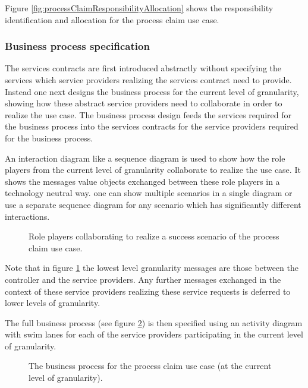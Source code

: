 \documentclass{IOS-Book-Article}
\begin{document}
Figure \ref{fig:processClaimResponsibilityAllocation} shows the responsibility identification and allocation for the
process claim use case.


\subsubsection{Business process specification}

The services contracts are first introduced abstractly without specifying the services which service providers
realizing the services contract need to provide. Instead one next designs the business process for the current
level of granularity, showing how these abstract service providers need to collaborate in order to realize the use case.
The business process design feeds the services required for the business process into the services contracts for
the service providers required for the business process.

An interaction diagram like a sequence diagram is used to show how the role players from the current level of granularity
collaborate to realize the use case. It shows the messages value objects exchanged between these role players in a
technology neutral way. one can show multiple scenarios in a single diagram or use a separate sequence diagram
for any scenario which has significantly different interactions.

\begin{figure}[hbt]
  \centering
  \caption{Role players collaborating to realize a success scenario of the process claim use case.}
  \label{fig:processClaimSuccess}
\end{figure}

Note that in figure \ref{fig:processClaimSuccess} the lowest level granularity messages are those between the controller and the service providers. Any
further messages exchanged in the context of these service providers realizing these service requests is deferred
to lower levels of granularity.

The full business process (see figure \ref{fig:processClaimBusinessProcess}) is then specified using an activity diagram with swim
lanes for each of the service providers participating in the current level of granularity.

\begin{figure}[htb]
  \centering
  \caption{The business process for the process claim use case (at the current level of granularity).}
  \label{fig:processClaimBusinessProcess}
\end{figure}
\end{document}

